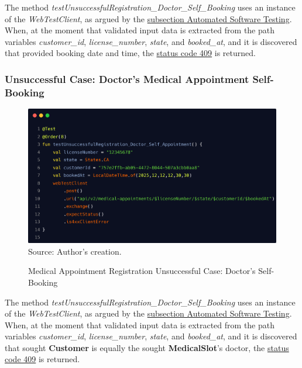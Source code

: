 The method \textit{testUnsuccessfulRegistration\_Doctor\_Self\_Booking} uses an instance of the \textit{WebTestClient}, as argued by the \hyperref[subsection:automated_software_testing]{subsection Automated Software Testing}. When, at the moment that validated input data is extracted from the path variables \textit{customer\_id}, \textit{license\_number}, \textit{state}, and \textit{booked\_at}, and it is discovered that provided booking date and time, the \hyperref[tab:summary_http_status_codes]{status code 409} is returned.

\subsubsection{Unsuccessful Case: Doctor's Medical Appointment Self-Booking}

\begin{figure}[H]
	\centering
	\caption{Medical Appointment Registration Unsuccessful Case: Doctor's Self-Booking}
	\includegraphics[width=1\linewidth]{figures/medical_appointment_registration_integration_test_unsuccessful_case_doctor_self_booking.png}
	\label{fig:medical_appointment_registration_integration_test_unsuccessful_case_doctor_self_booking}
	\footnotesize Source: Author's creation.
\end{figure}

The method \textit{testUnsuccessfulRegistration\_Doctor\_Self\_Booking} uses an instance of the \textit{WebTestClient}, as argued by the \hyperref[subsection:automated_software_testing]{subsection Automated Software Testing}. When, at the moment that validated input data is extracted from the path variables \textit{customer\_id}, \textit{license\_number}, \textit{state}, and \textit{booked\_at}, and it is discovered that sought \textbf{Customer} is equally the sought \textbf{MedicalSlot}'s doctor, the \hyperref[tab:summary_http_status_codes]{status code 409} is returned.


